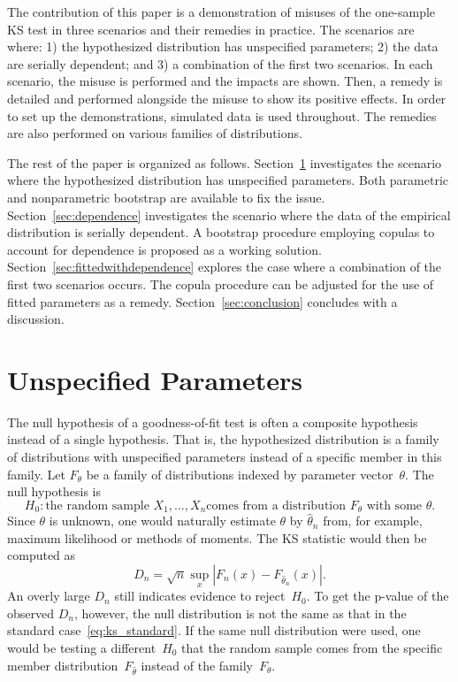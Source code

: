 \documentclass[12pt, letterpaper, titlepage]{article}
\begin{document}
The contribution of this paper is a demonstration of misuses of the one-sample
KS test in three scenarios and their remedies in practice. The scenarios are
where:
1) the hypothesized distribution has unspecified parameters;
2) the data are serially dependent; and
3) a combination of the first two scenarios.
In each scenario, the misuse is performed and the impacts are shown. Then, a
remedy is detailed and performed alongside the misuse to show its positive
effects. In order to set up the demonstrations, simulated data is used
throughout. The remedies are also performed on various families of
distributions.


The rest of the paper is organized as follows. Section~\ref{sec:fitted}
investigates the scenario where the hypothesized distribution has unspecified
parameters. Both parametric and nonparametric bootstrap are available to fix the
issue. Section~\ref{sec:dependence} investigates the scenario where the data of
the empirical distribution is serially dependent. A bootstrap procedure
employing copulas to account for dependence is proposed as a working solution.
Section~\ref{sec:fittedwithdependence}
explores the case where a combination of the first two scenarios occurs. The
copula procedure can be adjusted for the use of fitted parameters as a remedy.
Section~\ref{sec:conclusion} concludes with a discussion.

\section{Unspecified Parameters}
\label{sec:fitted}

The null hypothesis of a goodness-of-fit test is often a composite hypothesis
instead of a single hypothesis. That is, the hypothesized distribution is a
family of distributions with unspecified parameters instead of a specific member
in this family. Let $F_\theta$ be a family of distributions indexed by parameter
vector~$\theta$. The null hypothesis is
\[
  H_0: \text{the random sample $X_1, \ldots, X_n$
    comes from a distribution $F_\theta$ with some $\theta$.}
\]
Since $\theta$ is unknown, one would naturally estimate $\theta$ by
$\hat\theta_n$ from, for example, maximum likelihood or methods of moments. The
KS statistic would then be computed as
\begin{equation}
  \label{eq:ks_fitted}
  D_n = \sqrt{n} \sup_x | F_n(x) - F_{\hat\theta_n}(x) |.
\end{equation}
An overly large $D_n$ still indicates evidence to reject~$H_0$. To get the
p-value of the observed $D_n$, however, the null distribution is not the same as
that in the standard
case~\eqref{eq:ks_standard}. If the same null distribution were used, one would
be testing a different~$H_0$ that the random sample comes from the specific
member distribution~$F_{\hat\theta}$ instead of the family~$F_\theta$.
\end{document}
